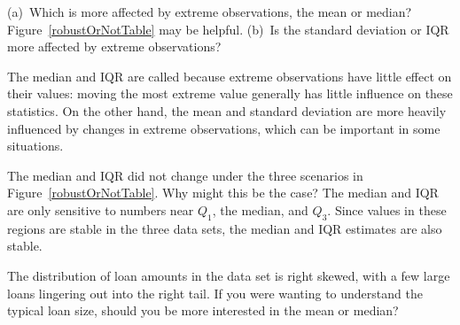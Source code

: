 \begin{exercisewrap}
\begin{nexercise} \label{interestRateWhichIsMoreRobust}
(a)~Which is more affected by extreme observations,
the mean or median?
Figure~\ref{robustOrNotTable} may be helpful.
(b)~Is the standard deviation or IQR more affected by
extreme observations?\footnotemark{}
\end{nexercise}
\end{exercisewrap}

The median and IQR are called  because
extreme observations have little effect on their values:
moving the most extreme value generally has little influence
on these statistics.
On the other hand, the mean and standard deviation
are more heavily influenced by changes in extreme observations,
which can be important in some situations.

\begin{examplewrap}
\begin{nexample}{The median and IQR did not change under the
    three scenarios in Figure~\ref{robustOrNotTable}.
    Why might this be the case?}
  The median and IQR are only sensitive to numbers
  near $Q_1$, the median, and $Q_3$.
  Since values in these regions are stable in the three
  data sets, the median and IQR estimates are also stable.
\end{nexample}
\end{examplewrap}

\begin{exercisewrap}
\begin{nexercise}
The distribution of loan amounts in the  data set
is right skewed, with a few large loans lingering out into the
right tail.
If you were wanting to understand the typical loan size,
should you be more interested in the mean
or median?\footnotemark
\end{nexercise}
\end{exercisewrap}

